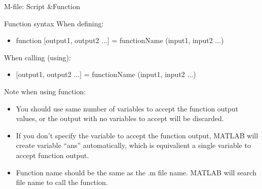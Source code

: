 \begin{frame}{M-file: Script \&Function}
\begin{block}{Function syntax}
When defining:
\begin{itemize}
\item function [output1, output2 ...] = functionName (input1, input2 ...)
\end{itemize}
When calling (using):
\begin{itemize}
\item $[$output1, output2 ...$]$ = functionName (input1, input2 ...)
\end{itemize}
\end{block}
Note when using function:
\begin{itemize}
\item You should use same number of variables to accept the function output values, or the output with no variables to accept will be discarded.
\item If you don't specify the variable to accept the function output, MATLAB will create variable ``ans'' automatically, which is equivalient a single variable to accept function output.
\item Function name should be the same as the .m file name. MATLAB will search file name to call the function.
\end{itemize}
\end{frame}

